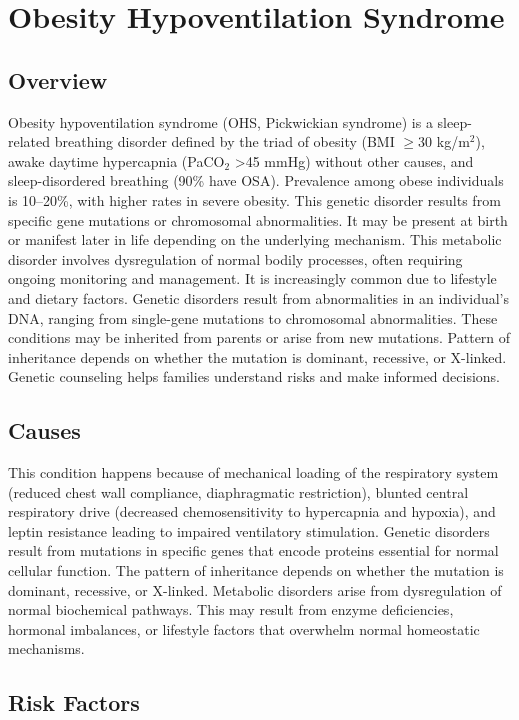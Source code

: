 \chapter{Obesity Hypoventilation Syndrome}
\label{sec:Obesity Hypoventilation Syndrome}

\section{Overview}
Obesity hypoventilation syndrome (OHS, Pickwickian syndrome) is a sleep-related breathing disorder defined by the triad of obesity (BMI $\ge$30 kg/m$^2$), awake daytime hypercapnia (PaCO$_2$ >45 mmHg) without other causes, and sleep-disordered breathing (90\% have OSA). Prevalence among obese individuals is 10--20\%, with higher rates in severe obesity. This genetic disorder results from specific gene mutations or chromosomal abnormalities. It may be present at birth or manifest later in life depending on the underlying mechanism. This metabolic disorder involves dysregulation of normal bodily processes, often requiring ongoing monitoring and management. It is increasingly common due to lifestyle and dietary factors. Genetic disorders result from abnormalities in an individual's DNA, ranging from single-gene mutations to chromosomal abnormalities. These conditions may be inherited from parents or arise from new mutations. Pattern of inheritance depends on whether the mutation is dominant, recessive, or X-linked. Genetic counseling helps families understand risks and make informed decisions.
\section{Causes}
This condition happens because of mechanical loading of the respiratory system (reduced chest wall compliance, diaphragmatic restriction), blunted central respiratory drive (decreased chemosensitivity to hypercapnia and hypoxia), and leptin resistance leading to impaired ventilatory stimulation. Genetic disorders result from mutations in specific genes that encode proteins essential for normal cellular function. The pattern of inheritance depends on whether the mutation is dominant, recessive, or X-linked. Metabolic disorders arise from dysregulation of normal biochemical pathways. This may result from enzyme deficiencies, hormonal imbalances, or lifestyle factors that overwhelm normal homeostatic mechanisms.   
\section{Risk Factors}


